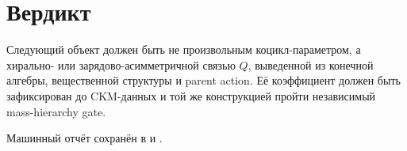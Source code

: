 \documentclass[12pt,a4paper]{article}
\begin{document}
\section{Вердикт}

Следующий объект должен быть не произвольным коцикл-параметром, а
хирально- или зарядово-асимметричной связью \(Q\), выведенной из конечной
алгебры, вещественной структуры и parent action. Её коэффициент должен быть
зафиксирован до CKM-данных и той же конструкцией пройти независимый
mass-hierarchy gate.

Машинный отчёт сохранён в
 и
.
\end{document}

